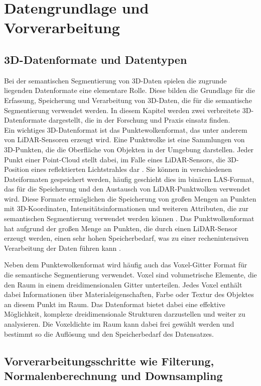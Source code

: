 \chapter{Datengrundlage und Vorverarbeitung}
\section{3D-Datenformate und Datentypen}
Bei der semantischen Segmentierung von 3D-Daten spielen die zugrunde liegenden
Datenformate eine elementare Rolle. Diese bilden die Grundlage für die
Erfassung, Speicherung und Verarbeitung von 3D-Daten, die für die semantische
Segmentierung verwendet werden. In diesem Kapitel werden zwei verbreitete
3D-Datenformate dargestellt, die in der Forschung und Praxis einsatz finden.
\\Ein wichtiges 3D-Datenformat ist das Punktewolkenformat, das unter anderem
von LiDAR-Sensoren erzeugt wird. Eine Punktwolke ist eine Sammlungen von
3D-Punkten, die die Oberfläche von Objekten in der Umgebung darstellen. Jeder
Punkt einer Point-Cloud stellt dabei, im Falle eines LiDAR-Sensors, die
3D-Position eines reflektierten Lichtstrahles dar \cite{20222324}. Sie können
in verschiedenen Dateiformaten gespeichert werden, häufig geschieht dies im
binären LAS-Format, das für die Speicherung und den Austausch von
LiDAR-Punktwolken verwendet wird. Diese Formate ermöglichen die Speicherung von
großen Mengen an Punkten mit 3D-Koordinaten, Intensitätsinformationen und
weiteren Attributen, die zur semantischen Segmentierung verwendet werden können
\cite{elphcik1991using}. Das Punktwolkenformat hat aufgrund der großen Menge an
Punkten, die durch einen LiDAR-Sensor erzeugt werden, einen sehr hohen
Speicherbedarf, was zu einer rechenintensiven Verarbeitung der Daten führen
kann \cite{8578570}.

Neben dem Punktewolkenformat wird häufig auch das Voxel-Gitter Format für die
semantische Segmentierung verwendet. Voxel sind volumetrische Elemente, die den
Raum in einem dreidimensionalen Gitter unterteilen. Jedes Voxel enthält dabei
Informationen über Materialeigenschaften, Farbe oder Textur des Objektes an
diesem Punkt im Raum. Das Datenformat bietet dabei eine effektive Möglichkeit,
komplexe dreidimensionale Strukturen darzustellen und weiter zu analysieren.
Die Voxeldichte im Raum kann dabei frei gewählt werden und bestimmt so die
Auflösung und den Speicherbedarf des
Datensatzes.\cite{niessner2013real,6706719}

\section{Vorverarbeitungsschritte wie Filterung, Normalenberechnung und Downsampling}

